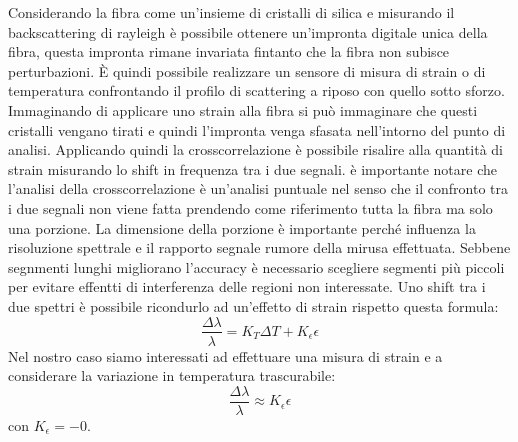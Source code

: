 Considerando la fibra come un'insieme di cristalli di silica e misurando il backscattering di rayleigh è possibile ottenere un'impronta digitale unica della fibra, questa impronta rimane invariata fintanto
che la fibra non subisce perturbazioni. È quindi possibile realizzare un sensore di misura di strain o
di temperatura confrontando il profilo di scattering a riposo con quello sotto sforzo. Immaginando di applicare uno strain alla fibra si può immaginare che questi cristalli vengano tirati e quindi l'impronta venga sfasata nell'intorno del punto di analisi. Applicando quindi la crosscorrelazione è possibile risalire alla quantità di strain misurando lo shift in frequenza tra i due segnali. è importante notare che l'analisi della crosscorrelazione è un'analisi puntuale nel senso che il confronto tra i due segnali non viene fatta prendendo come riferimento tutta la fibra ma solo una porzione. La dimensione della porzione è importante perché influenza la risoluzione spettrale e il rapporto segnale rumore della mirusa effettuata. Sebbene segnmenti lunghi migliorano l'accuracy è necessario scegliere segmenti più piccoli per evitare effentti di interferenza delle regioni non interessate. Uno shift tra i due spettri è possibile ricondurlo ad un'effetto di strain rispetto questa formula:
$$\frac{\Delta\lambda}{\lambda} = K_T\Delta T + K_{\epsilon}\epsilon $$
Nel nostro caso siamo interessati ad effettuare una misura di strain e a considerare la variazione in temperatura trascurabile:
$$\frac{\Delta\lambda}{\lambda} \approx K_{\epsilon}\epsilon $$
con $K_{\epsilon} = -0.$



